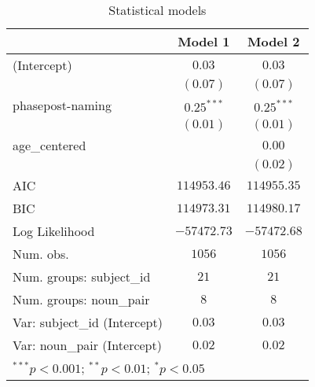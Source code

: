 
\begin{table}
\begin{center}
\begin{tabular}{l c c}
\hline
 & Model 1 & Model 2 \\
\hline
(Intercept)                  & $0.03$       & $0.03$       \\
                             & $(0.07)$     & $(0.07)$     \\
phasepost-naming             & $0.25^{***}$ & $0.25^{***}$ \\
                             & $(0.01)$     & $(0.01)$     \\
age\_centered                &              & $0.00$       \\
                             &              & $(0.02)$     \\
\hline
AIC                          & $114953.46$  & $114955.35$  \\
BIC                          & $114973.31$  & $114980.17$  \\
Log Likelihood               & $-57472.73$  & $-57472.68$  \\
Num. obs.                    & $1056$       & $1056$       \\
Num. groups: subject\_id     & $21$         & $21$         \\
Num. groups: noun\_pair      & $8$          & $8$          \\
Var: subject\_id (Intercept) & $0.03$       & $0.03$       \\
Var: noun\_pair (Intercept)  & $0.02$       & $0.02$       \\
\hline
\multicolumn{3}{l}{\scriptsize{$^{***}p<0.001$; $^{**}p<0.01$; $^{*}p<0.05$}}
\end{tabular}
\caption{Statistical models}
\label{table:coefficients}
\end{center}
\end{table}

